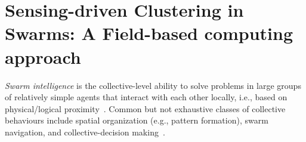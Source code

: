 \newcommand{\LP}[2]{\marginpar{$\color{red}\star$}\color{gray}\sout{#1}\color{blue}\
  #2 \color{black}}
\newcommand{\LPr}[2]{{\color{gray}\ #1\ \color{orange}\  #2}}


\chapter[Sensing-driven Clustering in Swarms]{Sensing-driven Clustering in Swarms: A Field-based computing approach}\label{chap:eng:clustering}\mtcaddchapter
\minitoc%

\emph{Swarm intelligence}
 is the collective-level ability to solve problems
 in large groups of relatively simple agents that interact with each other locally, i.e., based on physical/logical proximity~\cite{DBLP:books/daglib/0032898}.
%
Common but not exhaustive classes of collective behaviours
 include spatial organization (e.g., pattern formation),
 swarm navigation,
 and collective-decision making~\cite{DBLP:journals/swarm/BrambillaFBD13}.
%

